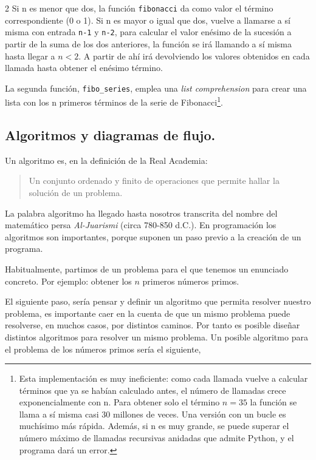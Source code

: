 \begin{paracol}{2}
Si n es menor que dos, la función \texttt{fibonacci} da como valor el término correspondiente (0 o 1). Si n es mayor o igual que dos, vuelve a llamarse a sí misma con entrada \texttt{n-1} y \texttt{n-2}, para calcular el valor enésimo de la sucesión a partir de la suma de los dos anteriores, la función se irá llamando a sí misma hasta  llegar a $n<2$. A partir de ahí irá devolviendo los valores obtenidos en cada llamada hasta obtener el enésimo término.

La segunda función, \texttt{fibo_series}, emplea una \emph{list comprehension} para crear una lista con los n primeros términos de la serie de Fibonacci\footnote{Esta implementación es muy ineficiente: como cada llamada vuelve a calcular términos que ya se habían calculado antes, el número de llamadas crece exponencialmente con n. Para obtener solo el término $n=35$ la función se llama a sí misma casi 30 millones de veces. Una versión con un bucle es muchísimo más rápida. Además, si n es muy grande, se puede superar el número máximo de llamadas recursivas anidadas que admite Python, y el programa dará un error.}.

\subsection{Algoritmos y diagramas de flujo.} 
Un algoritmo es, en la definición de la Real Academia: 
\begin{quotation}
Un conjunto ordenado y finito de operaciones que permite hallar la solución de un problema.
\end{quotation}

La palabra algoritmo ha llegado hasta nosotros transcrita del nombre del matemático persa \emph{Al-Juarismi} (circa 780-850 d.C.). En programación los algoritmos son importantes, porque suponen un paso previo a la creación de un programa.

Habitualmente, partimos de un problema para el que tenemos un enunciado concreto. Por ejemplo: obtener los $n$ primeros números primos. 

El siguiente paso, sería pensar y definir un algoritmo que permita resolver nuestro problema, es importante caer en la cuenta de que un mismo problema puede resolverse, en muchos casos, por distintos caminos. Por tanto es posible diseñar distintos algoritmos para resolver un mismo problema. Un posible algoritmo para el problema de los números primos sería el siguiente,


\end{paracol}
